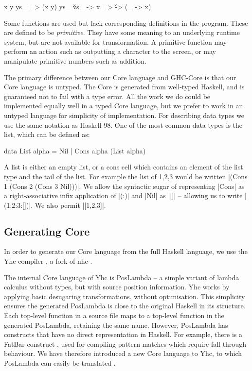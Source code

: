 \begin{code}
x y ys_      => (x y) ys_
\v vs_ -> x  => \v -> (\vs_ -> x)
\end{code}

Some functions are used but lack corresponding definitions in the program. These are defined to be \textit{primitive}. They have some meaning to an underlying runtime system, but are not available for transformation. A primitive function may perform an action such as outputting a character to the screen, or may manipulate primitive numbers such as addition.

The primary difference between our Core language and GHC-Core \cite{ghc_core} is that our Core language is untyped. The Core is generated from well-typed Haskell, and is guaranteed not to fail with a type error. All the work we do could be implemented equally well in a typed Core language, but we prefer to work in an untyped language for simplicity of implementation. For describing data types we use the same notation as Haskell 98. One of the most common data types is the list, which can be defined as:

\begin{code}
data List alpha = Nil | Cons alpha (List alpha)
\end{code}

A list is either an empty list, or a cons cell which contains an element of the list type and the tail of the list. For example the list of 1,2,3 would be written |(Cons 1 (Cons 2 (Cons 3 Nil)))|. We allow the syntactic sugar of representing |Cons| as a right-associative infix application of |(:)| and |Nil| as |[]| -- allowing us to write |(1:2:3:[])|. We also permit |[1,2,3]|.

\subsection{Generating Core}

In order to generate our Core language from the full Haskell language, we use the Yhc compiler \cite{yhc}, a fork of nhc \cite{nhc}.

The internal Core language of Yhc is PosLambda -- a simple variant of lambda calculus without types, but with source position information. Yhc works by applying basic desugaring transformations, without optimisation. This simplicity ensures the generated PosLambda is close to the original Haskell in its structure. Each top-level function in a source file maps to a top-level function in the generated PosLambda, retaining the same name. However, PosLambda has constructs that have no direct representation in Haskell. For example, there is a FatBar construct \cite{spj:implementation}, used for compiling pattern matches which require fall through behaviour. We have therefore introduced a new Core language to Yhc, to which PosLambda can easily be translated \cite{me:yhc_core}.

